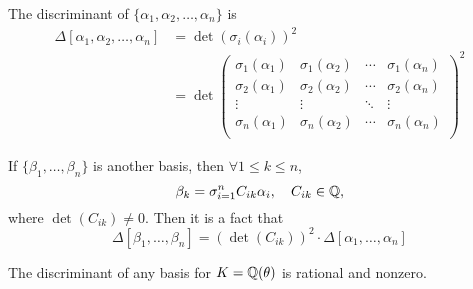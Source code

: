 \begin{definition}
    The discriminant of $\{\alpha_1, \alpha_2, \dots, \alpha_n\}$ is
    \begin{align*}
        \Delta[\alpha_1, \alpha_2, \dots, \alpha_n] & = \det\left(\sigma_i(\alpha_i)\right)^2 \\
                                                    & = \det
        \begin{pmatrix}
            \sigma_1(\alpha_1) & \sigma_1(\alpha_2) & \cdots & \sigma_1(\alpha_n) \\
            \sigma_2(\alpha_1) & \sigma_2(\alpha_2) & \cdots & \sigma_2(\alpha_n) \\
            \vdots             & \vdots             & \ddots & \vdots             \\
            \sigma_n(\alpha_1) & \sigma_n(\alpha_2) & \cdots & \sigma_n(\alpha_n) \\
        \end{pmatrix}^2
    \end{align*}
\end{definition}
If $\{\beta_1, \dots, \beta_n\}$ is another basis, then $\forall 1\leq k\leq n$,
\[\beta_k = \sigma_{i = 1}^n C_{ik}\alpha_i, \quad C_{ik}\in \mathbb Q,\]
where $\det(C_{ik})\neq 0$. Then it is a fact that
\[\Delta[\beta_1, \dots, \beta_n] = \left(\det(C_{ik})\right)^2\cdot \Delta[\alpha_1, \dots, \alpha_n]\]
\begin{theorem}\label{thm:2.7}
    The discriminant of any basis for $K = \mathbb Q(\theta)$ is rational and nonzero.
\end{theorem}
